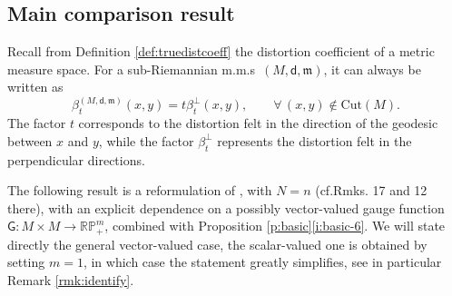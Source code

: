 \documentclass[11pt,a4paper]{article}
\theoremstyle{plain}
\theoremstyle{definition}
\theoremstyle{remark}
\numberwithin{equation}{section}
\newcommand{\RP}{\mathbb{RP}} %
\newcommand{\mm}{\mathfrak m}
\newcommand{\sfd}{\mathsf d}
\newcommand{\sfG}{\mathsf G}
\begin{document}
\subsection{Main comparison result}\label{sec:maincomparison}

Recall from Definition \ref{def:truedistcoeff} the distortion coefficient of a metric measure space. For a sub-Riemannian m.m.s\ $(M,\sfd,\mm)$, it can always be written as
\begin{equation}
\beta_t^{(M,\sfd,\mm)}(x,y) = t \beta_t^\perp(x,y), \qquad \forall\, (x,y)\notin \mathrm{Cut}(M).
\end{equation}
The factor $t$ corresponds to the distortion felt in the direction of the geodesic between $x$ and $y$, while the factor $\beta_t^\perp$ represents the distortion felt in the perpendicular directions.

The following result is a reformulation of \cite[Thm.\@ 16]{BRMathAnn}, with $N=n$ (cf.\@ Rmks. 17 and 12 there), with an explicit dependence on a possibly vector-valued gauge function $\sfG:M\times M \to \RP^m_+$, combined with Proposition \ref{p:basic}\ref{i:basic-6}. We will state directly the general vector-valued case, the scalar-valued one is obtained by setting $m=1$,  in which case the statement greatly simplifies, see in particular Remark \ref{rmk:identify}.
\end{document}
